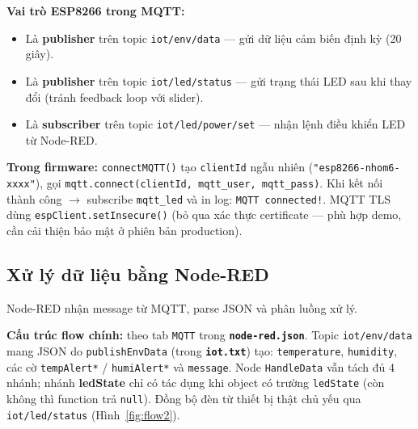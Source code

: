 \documentclass[13pt,a4paper]{article}
\newcommand{\code}[1]{\texttt{#1}}
\newcommand{\file}[1]{\textbf{\texttt{#1}}}
\begin{document}
\textbf{Vai trò ESP8266 trong MQTT:}
\begin{itemize}
    \item Là \textbf{publisher} trên topic \code{iot/env/data} --- gửi dữ liệu cảm biến định kỳ (20 giây).
    \item Là \textbf{publisher} trên topic \code{iot/led/status} --- gửi trạng thái LED sau khi thay đổi (tránh feedback loop với slider).
    \item Là \textbf{subscriber} trên topic \code{iot/led/power/set} --- nhận lệnh điều khiển LED từ Node-RED.
\end{itemize}

\textbf{Trong firmware:}
\code{connectMQTT()} tạo \code{clientId} ngẫu nhiên (\code{"esp8266-nhom6-xxxx"}), gọi \code{mqtt.connect(clientId, mqtt\_user, mqtt\_pass)}. Khi kết nối thành công $\rightarrow$ subscribe \code{mqtt\_led} và in log: \code{MQTT connected!}. MQTT TLS dùng \code{espClient.setInsecure()} (bỏ qua xác thực certificate --- phù hợp demo, cần cải thiện bảo mật ở phiên bản production).

\subsection{Xử lý dữ liệu bằng Node-RED}
\label{sec:nodered}

Node-RED nhận message từ MQTT, parse JSON và phân luồng xử lý.

\textbf{Cấu trúc flow chính:} theo tab \texttt{MQTT} trong \file{node-red.json}. Topic \texttt{iot/env/data} mang JSON do \code{publishEnvData} (trong \file{iot.txt}) tạo: \code{temperature}, \code{humidity}, các cờ \code{tempAlert*} / \code{humiAlert*} và \code{message}. Node \texttt{HandleData} vẫn tách đủ 4 nhánh; nhánh \textbf{ledState} chỉ có tác dụng khi object có trường \code{ledState} (còn không thì function trả \code{null}). Đồng bộ đèn từ thiết bị thật chủ yếu qua \texttt{iot/led/status} (Hình~\ref{fig:flow2}).
\end{document}
